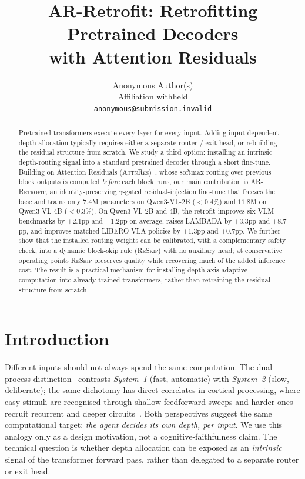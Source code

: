 \documentclass{article}
\title{AR-Retrofit: Retrofitting Pretrained Decoders\\with Attention Residuals}
\author{
  Anonymous Author(s) \\
  Affiliation withheld \\
  \texttt{anonymous@submission.invalid}
}
\newcommand{\attnres}{\textsc{AttnRes}}
\newcommand{\reskip}{\textsc{ReSkip}}
\newcommand{\retrofit}{\textsc{AR-Retrofit}}
\begin{document}
\maketitle

\begin{abstract}
Pretrained transformers execute every layer for every input. Adding input-dependent depth allocation typically requires either a separate router / exit head, or rebuilding the residual structure from scratch. We study a third option: installing an intrinsic depth-routing signal into a standard pretrained decoder through a short fine-tune. Building on Attention Residuals (\attnres{})~\citep{chen2026attnres}, whose softmax routing over previous block outputs is computed \emph{before} each block runs, our main contribution is \retrofit{}, an identity-preserving $\gamma$-gated residual-injection fine-tune that freezes the base and trains only $7.4$M parameters on Qwen3-VL-2B ($<0.4\%$) and $11.8$M on Qwen3-VL-4B ($<0.3\%$). On Qwen3-VL-2B and 4B, the retrofit improves six VLM benchmarks by $+2.1$pp and $+1.2$pp on average, raises LAMBADA by $+3.3$pp and $+8.7$pp, and improves matched LIBERO VLA policies by $+1.3$pp and $+0.7$pp. We further show that the installed routing weights can be calibrated, with a complementary safety check, into a dynamic block-skip rule (\reskip{}) with no auxiliary head; at conservative operating points \reskip{} preserves quality while recovering much of the added inference cost. The result is a practical mechanism for installing depth-axis adaptive computation into already-trained transformers, rather than retraining the residual structure from scratch.
\end{abstract}

\section{Introduction}
\label{sec:intro}

Different inputs should not always spend the same computation. The dual-process distinction~\citep{kahneman2011thinking} contrasts \emph{System~1} (fast, automatic) with \emph{System~2} (slow, deliberate); the same dichotomy has direct correlates in cortical processing, where easy stimuli are recognised through shallow feedforward sweeps and harder ones recruit recurrent and deeper circuits~\citep{lamme2000distinct, kar2019recurrent, kietzmann2019recurrence, spoerer2020recurrent}. Both perspectives suggest the same computational target: \emph{the agent decides its own depth, per input}. We use this analogy only as a design motivation, not a cognitive-faithfulness claim. The technical question is whether depth allocation can be exposed as an \emph{intrinsic} signal of the transformer forward pass, rather than delegated to a separate router or exit head.
\end{document}

